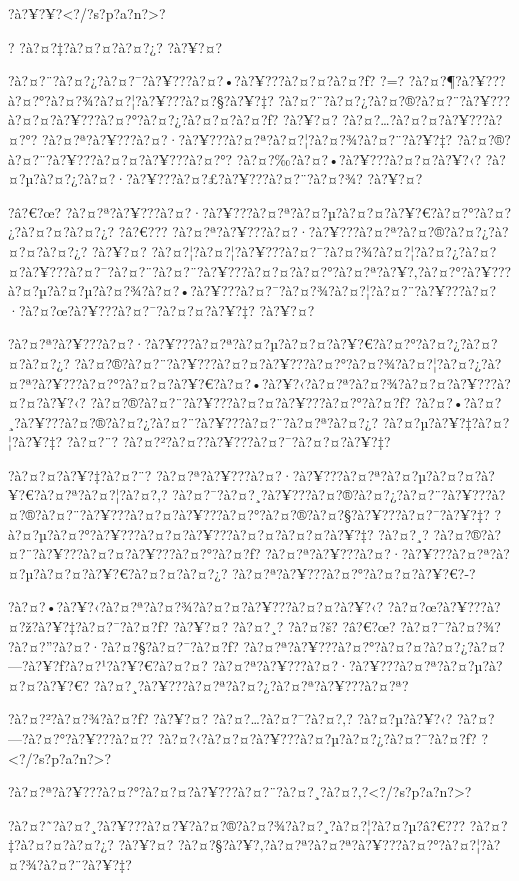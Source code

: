 \documentclass[11pt, openany]{book}
\begin{document}
{{{{{{{{{{{{{{{{{{?à?¥?¥?\textless{}?/?s?p?a?n?\textgreater{}?

? ?à?¤?‡?à?¤?¤?à?¤?¿? ?à?¥?¤?

?à?¤?¨?à?¤?¿?à?¤?¯?à?¥???à?¤?•?à?¥???à?¤?¤?à?¤?ƒ? ?=?
?à?¤?¶?à?¥???à?¤?°?à?¤?¾?à?¤?¦?à?¥???à?¤?§?à?¥?‡?
?à?¤?¨?à?¤?¿?à?¤?®?à?¤?¨?à?¥???à?¤?¤?à?¥???à?¤?°?à?¤?¿?à?¤?¤?à?¤?ƒ?
?à?¥?¤? ?à?¤?\ldots{}?à?¤?¤?à?¥???à?¤?°?
?à?¤?ª?à?¥???à?¤?·?à?¥???à?¤?ª?à?¤?¦?à?¤?¾?à?¤?¨?à?¥?‡?
?à?¤?®?à?¤?¨?à?¥???à?¤?¤?à?¥???à?¤?°? ?à?¤?‰?à?¤?•?à?¥???à?¤?¤?à?¥?‹?
?à?¤?µ?à?¤?¿?à?¤?·?à?¥???à?¤?£?à?¥???à?¤?¨?à?¤?¾? ?à?¥?¤?

?â?€?œ?
?à?¤?ª?à?¥???à?¤?·?à?¥???à?¤?ª?à?¤?µ?à?¤?¤?à?¥?€?à?¤?°?à?¤?¿?à?¤?¤?à?¤?¿?
?â?€??? ?à?¤?ª?à?¥???à?¤?·?à?¥???à?¤?ª?à?¤?®?à?¤?¿?à?¤?¤?à?¤?¿? ?à?¥?¤?
?à?¤?¦?à?¤?¦?à?¥???à?¤?¯?à?¤?¾?à?¤?¦?à?¤?¿?à?¤?¤?à?¥???à?¤?¯?à?¤?¨?à?¤?¨?à?¥???à?¤?¤?à?¤?°?à?¤?ª?à?¥?‚?à?¤?°?à?¥???à?¤?µ?à?¤?µ?à?¤?¾?à?¤?•?à?¥???à?¤?¯?à?¤?¾?à?¤?¦?à?¤?¨?à?¥???à?¤?·?à?¤?œ?à?¥???à?¤?¯?à?¤?¤?à?¥?‡?
?à?¥?¤?

?à?¤?ª?à?¥???à?¤?·?à?¥???à?¤?ª?à?¤?µ?à?¤?¤?à?¥?€?à?¤?°?à?¤?¿?à?¤?¤?à?¤?¿?
?à?¤?®?à?¤?¨?à?¥???à?¤?¤?à?¥???à?¤?°?à?¤?¾?à?¤?¦?à?¤?¿?à?¤?ª?à?¥???à?¤?°?à?¤?¤?à?¥?€?à?¤?•?à?¥?‹?à?¤?ª?à?¤?¾?à?¤?¤?à?¥???à?¤?¤?à?¥?‹?
?à?¤?®?à?¤?¨?à?¥???à?¤?¤?à?¥???à?¤?°?à?¤?ƒ?
?à?¤?•?à?¤?¸?à?¥???à?¤?®?à?¤?¿?à?¤?¨?à?¥???à?¤?¨?à?¤?ª?à?¤?¿?
?à?¤?µ?à?¥?‡?à?¤?¦?à?¥?‡? ?à?¤?¨? ?à?¤?²?à?¤?­?à?¥???à?¤?¯?à?¤?¤?à?¥?‡?

?à?¤?¤?à?¥?‡?à?¤?¨?
?à?¤?ª?à?¥???à?¤?·?à?¥???à?¤?ª?à?¤?µ?à?¤?¤?à?¥?€?à?¤?ª?à?¤?¦?à?¤?‚?
?à?¤?¯?à?¤?¸?à?¥???à?¤?®?à?¤?¿?à?¤?¨?à?¥???à?¤?®?à?¤?¨?à?¥???à?¤?¤?à?¥???à?¤?°?à?¤?®?à?¤?§?à?¥???à?¤?¯?à?¥?‡?
?à?¤?µ?à?¤?°?à?¥???à?¤?¤?à?¥???à?¤?¤?à?¤?¤?à?¥?‡? ?à?¤?¸?
?à?¤?®?à?¤?¨?à?¥???à?¤?¤?à?¥???à?¤?°?à?¤?ƒ?
?à?¤?ª?à?¥???à?¤?·?à?¥???à?¤?ª?à?¤?µ?à?¤?¤?à?¥?€?à?¤?¤?à?¤?¿?
?à?¤?ª?à?¥???à?¤?°?à?¤?¤?à?¥?€?-?

?à?¤?•?à?¥?‹?à?¤?ª?à?¤?¾?à?¤?¤?à?¥???à?¤?¤?à?¥?‹?
?à?¤?œ?à?¥???à?¤?ž?à?¥?‡?à?¤?¯?à?¤?ƒ? ?à?¥?¤? ?à?¤?¸? ?à?¤?š? ?â?€?œ?
?à?¤?¯?à?¤?¾? ?à?¤?''?à?¤?·?à?¤?§?à?¤?¯?à?¤?ƒ?
?à?¤?ª?à?¥???à?¤?°?à?¤?¤?à?¤?¿?à?¤?---?à?¥?ƒ?à?¤?¹?à?¥?€?à?¤?¤?
?à?¤?ª?à?¥???à?¤?·?à?¥???à?¤?ª?à?¤?µ?à?¤?¤?à?¥?€?
?à?¤?¸?à?¥???à?¤?ª?à?¤?¿?à?¤?ª?à?¥???à?¤?ª?

?à?¤?²?à?¤?¾?à?¤?ƒ? ?à?¥?¤? ?à?¤?\ldots{}?à?¤?¯?à?¤?‚? ?à?¤?µ?à?¥?‹?
?à?¤?---?à?¤?°?à?¥???à?¤?­? ?à?¤?‹?à?¤?¤?à?¥???à?¤?µ?à?¤?¿?à?¤?¯?à?¤?ƒ?
?\textless{}?/?s?p?a?n?\textgreater{}?

?à?¤?ª?à?¥???à?¤?°?à?¤?¤?à?¥???à?¤?¨?à?¤?¸?à?¤?‚?\textless{}?/?s?p?a?n?\textgreater{}?

?à?¤?˜?à?¤?¸?à?¥???à?¤?¥?à?¤?®?à?¤?¾?à?¤?¸?à?¤?¦?à?¤?µ?â?€???
?à?¤?‡?à?¤?¤?à?¤?¿? ?à?¥?¤?
?à?¤?§?à?¥?‚?à?¤?ª?à?¤?ª?à?¥???à?¤?°?à?¤?¦?à?¤?¾?à?¤?¨?à?¥?‡?

}}}}}}}}}}}}}}}}}}
\end{document}
